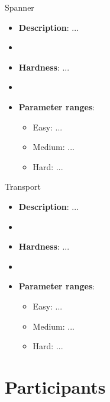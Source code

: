 \documentclass[aspectratio=169,xcolor=dvipsnames]{beamer}
\begin{document}
\begin{frame}{Spanner}

    \begin{itemize}
        \item \textbf{Description}: ...
        \item[]
        \item \textbf{Hardness}: ...
        \item[]
        \item \textbf{Parameter ranges}:
        \begin{itemize}
            \item Easy: ...
            \item Medium: ...
            \item Hard: ...
        \end{itemize}
    \end{itemize}

\end{frame}


\begin{frame}{Transport}

    \begin{itemize}
        \item \textbf{Description}: ...
        \item[]
        \item \textbf{Hardness}: ...
        \item[]
        \item \textbf{Parameter ranges}:
        \begin{itemize}
            \item Easy: ...
            \item Medium: ...
            \item Hard: ...
        \end{itemize}
    \end{itemize}

\end{frame}

\section{Participants}
\end{document}
